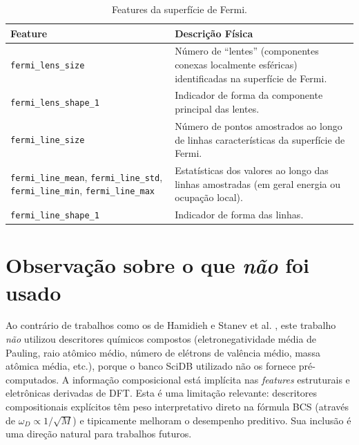 \documentclass[12pt, a4paper, oneside]{report}
\begin{document}
\begin{table}[H]
    \centering
    \caption{Features da superfície de Fermi.}
    \begin{tabular}{lp{10cm}}
        \toprule
        \textbf{Feature} & \textbf{Descrição Física} \\
        \midrule
        \texttt{fermi\_lens\_size} & Número de ``lentes'' (componentes conexas localmente esféricas) identificadas na superfície de Fermi. \\
        \texttt{fermi\_lens\_shape\_1} & Indicador de forma da componente principal das lentes. \\
        \texttt{fermi\_line\_size} & Número de pontos amostrados ao longo de linhas características da superfície de Fermi. \\
        \texttt{fermi\_line\_mean}, \texttt{fermi\_line\_std}, \texttt{fermi\_line\_min}, \texttt{fermi\_line\_max} & Estatísticas dos valores ao longo das linhas amostradas (em geral energia ou ocupação local). \\
        \texttt{fermi\_line\_shape\_1} & Indicador de forma das linhas. \\
        \bottomrule
    \end{tabular}
\end{table}

\section{Observação sobre o que \emph{não} foi usado}

Ao contrário de trabalhos como os de Hamidieh \cite{hamidieh2018} e Stanev et al. \cite{stanev2018}, este trabalho \emph{não} utilizou descritores químicos compostos (eletronegatividade média de Pauling, raio atômico médio, número de elétrons de valência médio, massa atômica média, etc.), porque o banco SciDB utilizado não os fornece pré-computados. A informação composicional está implícita nas \textit{features} estruturais e eletrônicas derivadas de DFT. Esta é uma limitação relevante: descritores compositionais explícitos têm peso interpretativo direto na fórmula BCS (através de $\omega_D \propto 1/\sqrt{M}$) e tipicamente melhoram o desempenho preditivo. Sua inclusão é uma direção natural para trabalhos futuros.
\end{document}
